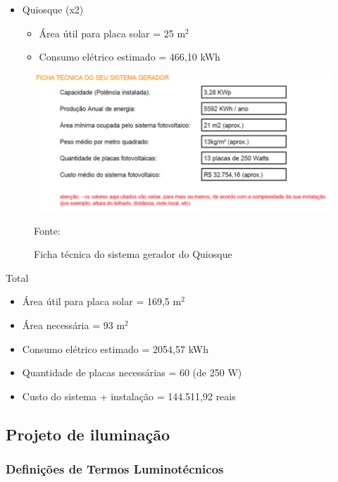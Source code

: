 \begin{itemize}
         \item Quiosque (x2)
	           \begin{itemize}
                       \item \'Area \'util para placa solar	=	25 m$^{2}$ 
                       \item Consumo el\'etrico estimado	=	466,10 kWh      
                  \end{itemize}	 
\end{itemize}

\begin{figure}[h!]
	 \centering
	\label{SistemaGeradorQuiosque}
	 \includegraphics[keepaspectratio=true,scale=0.8]{figuras/SistemaGeradorQuiosque.png}
	 \caption{Ficha t\'ecnica do sistema gerador do Quiosque}
	\small{Fonte: \protected\cite{PortalSolar}}
\end{figure}

Total

 \begin{itemize}
        \item \'Area \'util para placa solar	=	169,5 m$^{2}$ 
        \item \'Area necess\'aria	=	93 m$^{2}$ 
        \item Consumo el\'etrico estimado	=	2054,57 kWh
	\item Quantidade de placas necess\'arias	=	60 (de 250 W)
	\item Custo do sistema + instala\c{c}\~ao	=	144.511,92 reais
\end{itemize}

\subsection{Projeto de ilumina\c{c}\~ao}

\subsubsection{Defini\c{c}\~oes de Termos Luminot\'ecnicos}

